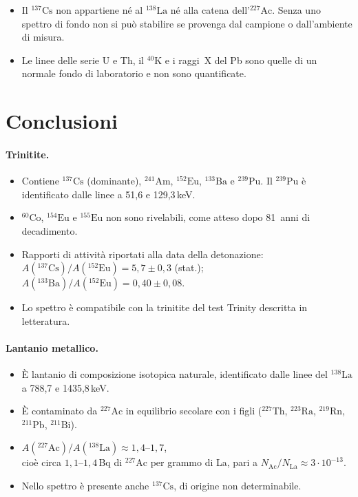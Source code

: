 \documentclass[11pt,a4paper]{article}
\newcommand{\nuc}[2]{\ensuremath{{}^{#1}\mathrm{#2}}}
\newcommand{\ee}[1]{\cdot 10^{#1}}
\begin{document}
\begin{itemize}
\item Il \nuc{137}{Cs} non appartiene né al \nuc{138}{La} né alla catena dell'\nuc{227}{Ac}. Senza uno spettro di fondo non si può stabilire se provenga dal campione o dall'ambiente di misura.
\item Le linee delle serie U e Th, il \nuc{40}{K} e i raggi~X del Pb sono quelle di un normale fondo di laboratorio e non sono quantificate.
\end{itemize}

\section{Conclusioni}

\paragraph{Trinitite.}
\begin{itemize}
\item Contiene \nuc{137}{Cs} (dominante), \nuc{241}{Am}, \nuc{152}{Eu}, \nuc{133}{Ba} e \nuc{239}{Pu}. Il \nuc{239}{Pu} è identificato dalle linee a 51,6 e 129,3\,keV.
\item \nuc{60}{Co}, \nuc{154}{Eu} e \nuc{155}{Eu} non sono rivelabili, come atteso dopo 81~anni di decadimento.
\item Rapporti di attività riportati alla data della detonazione:\\ $A(\nuc{137}{Cs})/A(\nuc{152}{Eu})=5{,}7\pm0{,}3$ (stat.);\quad $A(\nuc{133}{Ba})/A(\nuc{152}{Eu})=0{,}40\pm0{,}08$.
\item Lo spettro è compatibile con la trinitite del test Trinity descritta in letteratura.
\end{itemize}

\paragraph{Lantanio metallico.}
\begin{itemize}
\item È lantanio di composizione isotopica naturale, identificato dalle linee del \nuc{138}{La} a 788,7 e 1435,8\,keV.
\item È contaminato da \nuc{227}{Ac} in equilibrio secolare con i figli (\nuc{227}{Th}, \nuc{223}{Ra}, \nuc{219}{Rn}, \nuc{211}{Pb}, \nuc{211}{Bi}).
\item $A(\nuc{227}{Ac})/A(\nuc{138}{La})\approx1{,}4$--$1{,}7$,\\ cioè circa $1{,}1$--$1{,}4$\,Bq di \nuc{227}{Ac} per grammo di La, pari a $N_\mathrm{Ac}/N_\mathrm{La}\approx3\ee{-13}$.
\item Nello spettro è presente anche \nuc{137}{Cs}, di origine non determinabile.
\end{itemize}
\end{document}
